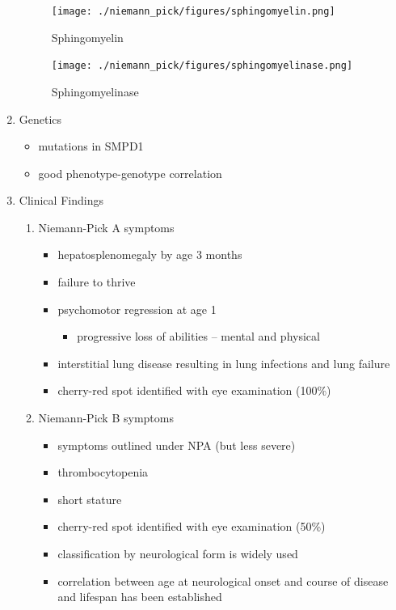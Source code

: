 \documentclass{scrartcl}
\begin{document}
\begin{enumerate}
\begin{figure}[htbp]
\centering
\texttt{[image: ./niemann\_pick/figures/sphingomyelin.png]}
\caption{\label{fig:org88913bc}
Sphingomyelin}
\end{figure}

\begin{figure}[htbp]
\centering
\texttt{[image: ./niemann\_pick/figures/sphingomyelinase.png]}
\caption{\label{fig:org1347823}
Sphingomyelinase}
\end{figure}

\item Genetics
\label{sec:org95c9404}
\begin{itemize}
\item mutations in SMPD1
\item good phenotype-genotype correlation
\end{itemize}

\item Clinical Findings
\label{sec:orgd14532e}
\begin{enumerate}
\item Niemann-Pick A symptoms
\label{sec:org6e93f53}
\begin{itemize}
\item hepatosplenomegaly by age 3 months
\item failure to thrive
\item psychomotor regression at age 1
\begin{itemize}
\item progressive loss of abilities – mental and physical
\end{itemize}
\item interstitial lung disease resulting in lung infections and lung failure
\item cherry-red spot identified with eye examination (100\%)
\end{itemize}

\item Niemann-Pick B symptoms
\label{sec:org792392c}
\begin{itemize}
\item symptoms outlined under NPA (but less severe)
\item thrombocytopenia
\item short stature
\item cherry-red spot identified with eye examination (50\%)
\item classification by neurological form is widely used
\item correlation between age at neurological onset and course of disease
and lifespan has been established
\end{itemize}
\end{enumerate}


\end{enumerate}
\end{document}
